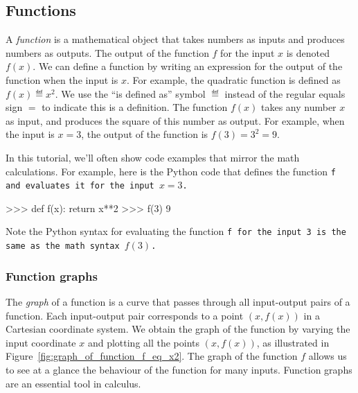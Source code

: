 	\subsection{Functions}

		A \emph{function} is a mathematical object
		that takes numbers as inputs and produces numbers as outputs.
		The output of the function $f$ for the input $x$ is denoted $f(x)$.
		We can define a function by writing an expression
		for the output of the function when the input is $x$.
		For example,
		the quadratic function is defined as $f(x) \eqdef x^2$.
		We use the ``is defined as'' symbol $\eqdef$
		instead of the regular equals sign $=$ to indicate this is a definition.
		The function $f(x)$ takes any number $x$ as input,
		and produces the square of this number as output.
		For example,
		when the input is $x=3$,
		the output of the function is $f(3) = 3^2 = 9$.

		In this tutorial,
		we'll often show code examples that mirror the math calculations.
		For example, 
		here is the Python code that defines the function \tt{f}
		and evaluates it for the input $x=3$.

		\begin{codeblock}
		>>> def f(x):
		        return x**2
		>>> f(3)
		9
		\end{codeblock}

		\noindent
		Note the Python syntax for evaluating the function \tt{f} for the input \tt{3}
		is the same as the math syntax $f(3)$.

		\subsubsection{Function graphs}

			The \emph{graph} of a function is a curve that passes through all input-output pairs of a function.
			Each input-output pair corresponds to a point $(x,f(x))$ in a Cartesian coordinate system.
			We obtain the graph of the function by varying the input coordinate $x$ and plotting all the points $(x, f(x))$,
			as illustrated in Figure~\ref{fig:graph_of_function_f_eq_x2}.
			The graph of the function $f$ allows us to see at a glance the behaviour of the function for many inputs.
			Function graphs are an essential tool in calculus.

